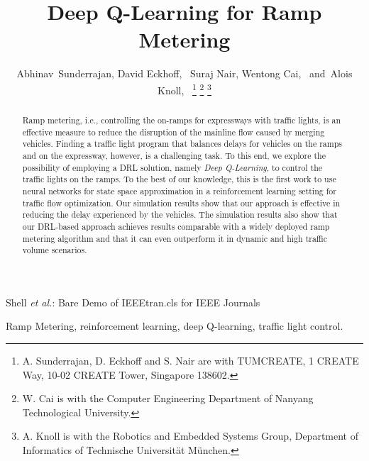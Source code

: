 \documentclass[conference]{IEEEtran}
\begin{document}
\title{Deep Q-Learning for Ramp Metering}

\author{Abhinav~Sunderrajan,
        David Eckhoff,~
        Suraj Nair,
        Wentong Cai,~
        and~Alois Knoll,~%
\thanks{A. Sunderrajan, D. Eckhoff and S. Nair are with TUMCREATE, 1 CREATE Way, 10-02 CREATE Tower, Singapore
	138602.}
\thanks{W. Cai is with the Computer Engineering Department of Nanyang Technological University.}
\thanks{A. Knoll is with the Robotics and Embedded Systems Group, Department of Informatics of Technische Universit\"at M\"unchen.}}


%
{Shell \MakeLowercase{\textit{et al.}}: Bare Demo of IEEEtran.cls for IEEE Journals}

\maketitle

\begin{abstract}
	Ramp metering, i.e., controlling the on-ramps for expressways with traffic lights, is an effective measure to reduce the disruption of the mainline flow caused by merging vehicles.
	Finding a traffic light program that balances delays for vehicles on the ramps and on the expressway, however, is a challenging task.
	To this end, we explore the possibility of employing a \ac{DRL} solution, namely \textit{Deep Q-Learning}, to control the traffic lights on the ramps.
	To the best of our knowledge, this is the first work to use neural networks for state space approximation in a reinforcement learning setting for traffic flow optimization.
	Our simulation results show that our approach is  effective in reducing the delay experienced by the vehicles. The simulation results also show that our DRL-based approach achieves results comparable with a widely deployed ramp metering algorithm and that it can even outperform it in dynamic and high traffic volume scenarios.
\end{abstract}


\begin{IEEEkeywords}
Ramp Metering, reinforcement learning, deep Q-learning, traffic light control.
\end{IEEEkeywords}
\end{document}
